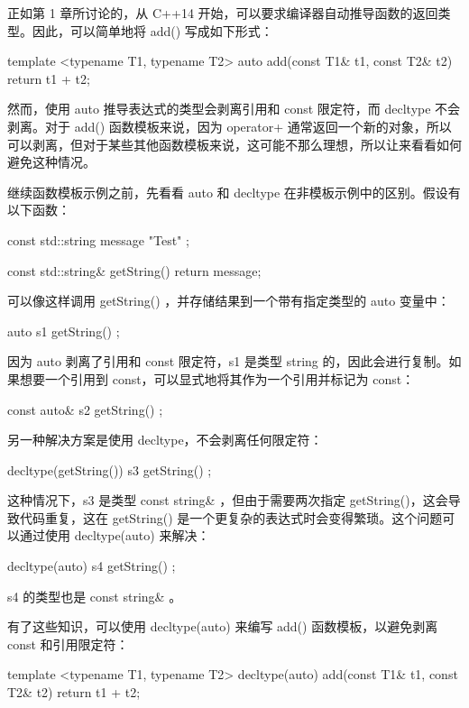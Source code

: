 正如第 1 章所讨论的，从 C++14 开始，可以要求编译器自动推导函数的返回类型。因此，可以简单地将 add() 写成如下形式：

\begin{cpp}
template <typename T1, typename T2>
auto add(const T1& t1, const T2& t2) { return t1 + t2; }
\end{cpp}

然而，使用 auto 推导表达式的类型会剥离引用和 const 限定符，而 decltype 不会剥离。对于 add() 函数模板来说，因为 operator+ 通常返回一个新的对象，所以可以剥离，但对于某些其他函数模板来说，这可能不那么理想，所以让来看看如何避免这种情况。

继续函数模板示例之前，先看看 auto 和 decltype 在非模板示例中的区别。假设有以下函数：

\begin{cpp}
const std::string message { "Test" };

const std::string& getString() { return message; }
\end{cpp}

可以像这样调用 getString() ，并存储结果到一个带有指定类型的 auto 变量中：

\begin{cpp}
auto s1 { getString() };
\end{cpp}

因为 auto 剥离了引用和 const 限定符，s1 是类型 string 的，因此会进行复制。如果想要一个引用到 const，可以显式地将其作为一个引用并标记为 const：

\begin{cpp}
const auto& s2 { getString() };
\end{cpp}

另一种解决方案是使用 decltype，不会剥离任何限定符：

\begin{cpp}
decltype(getString()) s3 { getString() };
\end{cpp}

这种情况下，s3 是类型 const string\& ，但由于需要两次指定 getString()，这会导致代码重复，这在 getString() 是一个更复杂的表达式时会变得繁琐。这个问题可以通过使用 decltype(auto) 来解决：

\begin{cpp}
decltype(auto) s4 { getString() };
\end{cpp}

s4 的类型也是 const string\& 。

有了这些知识，可以使用 decltype(auto) 来编写 add() 函数模板，以避免剥离 const 和引用限定符：

\begin{cpp}
template <typename T1, typename T2>
decltype(auto) add(const T1& t1, const T2& t2) { return t1 + t2; }
\end{cpp}

